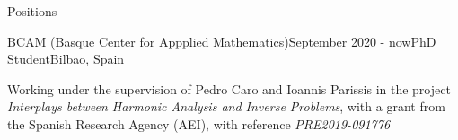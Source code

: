 \documentclass{resume} %
\begin{document}


\begin{rSection}{Positions}

    \begin{rSubsection}{BCAM (Basque Center for Appplied Mathematics)}{September 2020 - now}{PhD Student}{Bilbao, Spain}
        \item Working under the supervision of Pedro Caro and Ioannis Parissis in the project \textit{Interplays between Harmonic Analysis and Inverse Problems}, with a grant from the Spanish Research Agency (AEI), with reference \textit{PRE2019-091776}
    \end{rSubsection}
  
    
\end{rSection}


\end{document}
